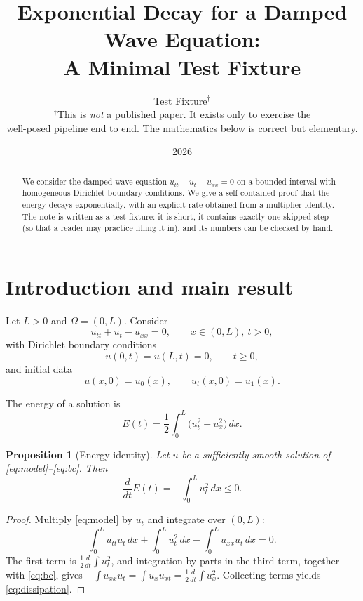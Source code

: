 \documentclass[11pt]{article}
\title{Exponential Decay for a Damped Wave Equation:\\ A Minimal Test Fixture}
\author{Test Fixture$^{\dagger}$\\
\small $^{\dagger}$This is \emph{not} a published paper. It exists only to exercise the\\
\small well-posed pipeline end to end. The mathematics below is correct but elementary.}
\date{2026}
\newtheorem{proposition}{Proposition}
\theoremstyle{definition}
\begin{document}
\maketitle

\begin{abstract}
We consider the damped wave equation $u_{tt}+u_{t}-u_{xx}=0$ on a bounded interval
with homogeneous Dirichlet boundary conditions. We give a self-contained proof that the
energy decays exponentially, with an explicit rate obtained from a multiplier identity.
The note is written as a test fixture: it is short, it contains exactly one skipped step
(so that a reader may practice filling it in), and its numbers can be checked by hand.
\end{abstract}

\section{Introduction and main result}

Let $L>0$ and $\Omega=(0,L)$. Consider
\begin{equation}
u_{tt}+u_{t}-u_{xx}=0,\qquad x\in(0,L),\ t>0,
\label{eq:model}
\end{equation}
with Dirichlet boundary conditions
\begin{equation}
u(0,t)=u(L,t)=0,\qquad t\ge 0,
\label{eq:bc}
\end{equation}
and initial data
\begin{equation}
u(x,0)=u_{0}(x),\qquad u_{t}(x,0)=u_{1}(x).
\label{eq:ic}
\end{equation}

The energy of a solution is
\begin{equation}
E(t)=\frac12\int_{0}^{L}\bigl(u_{t}^{2}+u_{x}^{2}\bigr)\,dx .
\label{eq:energy}
\end{equation}

\begin{proposition}[Energy identity]
\label{prop:energy}
Let $u$ be a sufficiently smooth solution of \eqref{eq:model}--\eqref{eq:bc}.
Then
\begin{equation}
\frac{d}{dt}E(t)=-\int_{0}^{L}u_{t}^{2}\,dx\le 0 .
\label{eq:dissipation}
\end{equation}
\end{proposition}

\begin{proof}
Multiply \eqref{eq:model} by $u_{t}$ and integrate over $(0,L)$:
\[
\int_{0}^{L}u_{tt}u_{t}\,dx+\int_{0}^{L}u_{t}^{2}\,dx-\int_{0}^{L}u_{xx}u_{t}\,dx=0 .
\]
The first term is $\frac12\frac{d}{dt}\int u_{t}^{2}$, and integration by parts in the
third term, together with \eqref{eq:bc}, gives
$-\int u_{xx}u_{t}=\int u_{x}u_{xt}=\frac12\frac{d}{dt}\int u_{x}^{2}$.
Collecting terms yields \eqref{eq:dissipation}.
\end{proof}
\end{document}
